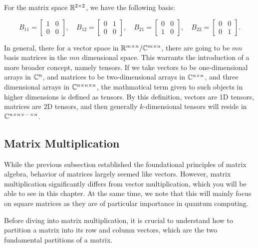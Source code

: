 \documentclass[12pt]{article}
\begin{document}
For the matrix space $\mathbb{R}^{2 \times 2}$, we have the following basis: 

\[
B_{11} =
\begin{bmatrix}
1 & 0 \\
0 & 0
\end{bmatrix},
\quad
B_{12} =
\begin{bmatrix}
0 & 1 \\
0 & 0
\end{bmatrix},
\quad
B_{21} =
\begin{bmatrix}
0 & 0 \\
1 & 0
\end{bmatrix},
\quad
B_{22} =
\begin{bmatrix}
0 & 0 \\
0 & 1
\end{bmatrix}.
\]


In general, there for a vector space in $\mathbb{R}^{m \times n}/\mathbb{C}^{m \times n}$, there are going to be $mn$ basis matrices in the $mn$ dimensional space. This warrants the introduction of a more broader concept, namely tensors. If we take vectors to be one-dimensional arrays in $\mathbb{C}^n$, and matrices to be two-dimensional arrays in $\mathbb{C}^{n \times n}$, and three dimensional arrays in $\mathbb{C}^{n \times n \times n}$, the mathmatical term given to such objects in higher dimensions is defined as tensors. By this definition, vectors are 1D tensors, matrices are 2D tensors, and then generally $k$-dimensional tensors will reside in $\mathbb{C}^{n \times n \times \cdots \times n}$. 

\subsection{Matrix Multiplication}

While the previous subsection established the foundational principles of matrix algebra, behavior of matrices largely seemed like vectors. However, matrix multiplication significantly differs from vector multiplication, which you will be able to see in this chapter. At the same time, we note that this will mainly focus on square matrices as they are of particular importance in quantum computing. 

Before diving into matrix multiplication, it is crucial to understand how to partition a matrix into its row and column vectors, which are the two fundamental partitions of a matrix. 
\end{document}
